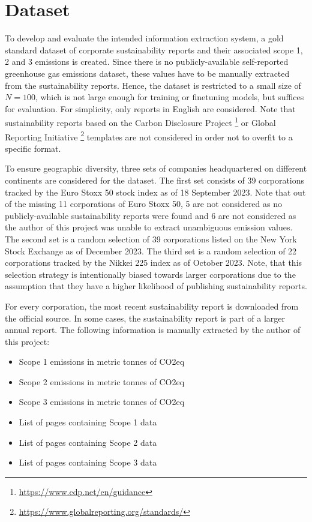 \documentclass[]{article}
\begin{document}
\section{Dataset}
\label{sec:dataset}
To develop and evaluate the intended information extraction system, a gold standard dataset of corporate sustainability reports and their associated scope 1, 2 and 3 emissions is created. Since there is no publicly-available self-reported greenhouse gas emissions dataset, these values have to be manually extracted from the sustainability reports. Hence, the dataset is restricted to a small size of $N=100$, which is not large enough for training or finetuning models, but suffices for evaluation. For simplicity, only reports in English are considered. Note that sustainability reports based on the Carbon Disclosure Project \footnote{\url{https://www.cdp.net/en/guidance}} or Global Reporting Initiative \footnote{\url{https://www.globalreporting.org/standards/}} templates are not considered in order not to overfit to a specific format.

To ensure geographic diversity, three sets of companies headquartered on different continents are considered for the dataset. The first set consists of 39 corporations tracked by the Euro Stoxx 50 stock index as of 18 September 2023. Note that out of the missing 11 corporations of Euro Stoxx 50, 5 are not considered as no publicly-available sustainability reports were found and 6 are not considered as the author of this project was unable to extract unambiguous emission values. The second set is a random selection of 39 corporations listed on the New York Stock Exchange as of December 2023. The third set is a random selection of 22 corporations tracked by the Nikkei 225 index as of October 2023. Note, that this selection strategy is intentionally biased towards larger corporations due to the assumption that they have a higher likelihood of publishing sustainability reports.

For every corporation, the most recent sustainability report is downloaded from the official source. In some cases, the sustainability report is part of a larger annual report. The following information is manually extracted by the author of this project:

\begin{itemize}
	\item Scope 1 emissions in metric tonnes of CO2eq
	\item Scope 2 emissions in metric tonnes of CO2eq
	\item Scope 3 emissions in metric tonnes of CO2eq
	\item List of pages containing Scope 1 data
	\item List of pages containing Scope 2 data
	\item List of pages containing Scope 3 data
\end{itemize}
\end{document}
